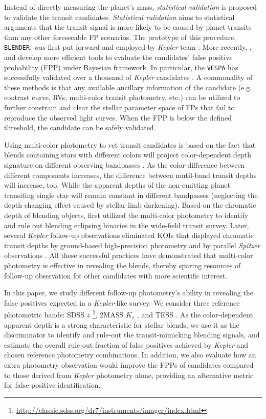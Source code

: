 \documentclass{aastex63}
\begin{document}
 Instead of directly measuring the planet's mass, \emph{statistical validation} is proposed to validate the transit candidates. \emph{Statistical validation} aims to  statistical arguments that the transit signal is more likely to be caused by planet transits than any other foreseeable FP scenarios. The prototype of this procedure, \texttt{BLENDER}, was first put forward and employed by \emph{Kepler} team \citep{Torres2005,Torres2011}. More recently, \cite{Morton2012}, and \cite{Diaz2014} develop more efficient tools to evaluate the candidates' false positive probability (FPP) under Bayesian framework. In particular, the \texttt{VESPA} has successfully validated over a thousand of \emph{Kepler} candidates \citep{Morton2016}. A commonality of these methods is that any available ancillary information of the candidate (e.g. contrast curve, RVs, multi-color transit photometry, etc.) can be utilized to further constrain and clear the stellar parameter space of FPs that fail to reproduce the observed light curves. When the FPP is below the defined threshold, the candidate can be safely validated.

 Using multi-color photometry to vet transit candidates is based on the fact that blends containing stars with different colors will project color-dependent depth signature on different observing bandpasses \citep{Rosenblatt1971,Tingley2004}. As the color-difference between different components increases, the difference between mutil-band transit depths will increase, too. While the apparent depths of the non-emitting planet transiting single star will remain constant in different bandpasses (neglecting the depth-changing effect caused by stellar limb darkening). Based on the chromatic depth of blending objects, \cite{ODonovan2006} first utilized the multi-color photometry to identify and rule out blending eclipsing binaries in the wide-field transit survey. Later, several \emph{Kepler} follow-up observations eliminated KOIs that displayed chromatic transit depths by ground-based high-precision photometry \citep{Colon2011,Colon2012,Tingley2014,Colon2015} and by parallel \emph{Spitzer} observations \citep{Torres2011,Fressin2012,Desert2015b}. All these successful practices have demonstrated that multi-color photometry is effective in revealing the blends, thereby sparing resources of follow-up observation for other candidates with more scientific interest.

 In this paper, we study different follow-up photometry's ability in revealing the false positives expected in a \emph{Kepler}-like survey. We consider three reference photometric bands: SDSS $z$ \footnote{\url{http://classic.sdss.org/dr7/instruments/imager/index.html}}, 2MASS $K_s$ \citep{Cohen2003}, and TESS \citep{Ricker2014}. As the color-dependent apparent depth is a strong characteristic for stellar blends, we use it as the discriminator to identify and rule-out the transit-mimicking blending signals, and estimate the overall rule-out fraction of false positives achieved by \emph{Kepler} and chosen reference photometry combinations. In addition, we also evaluate how an extra photometry observation would improve the FPPs of candidates compared to those derived from \emph{Kepler} photometry alone, providing an alternative metric for false positive identification. 
\end{document}

